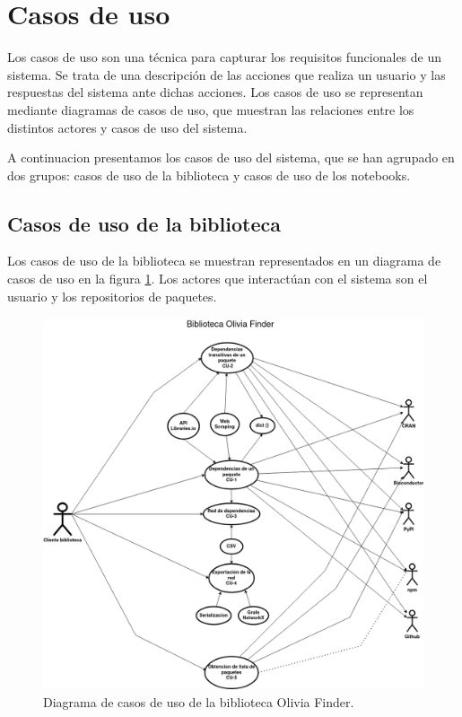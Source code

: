 \section{Casos de uso}

Los casos de uso son una técnica para capturar los requisitos funcionales de un sistema. Se trata de una 
descripción de las acciones que realiza un usuario y las respuestas del sistema ante dichas acciones. 
Los casos de uso se representan mediante diagramas de casos de uso, que muestran las relaciones entre los distintos actores y casos de uso del sistema.

A continuacion presentamos los casos de uso del sistema, que se han agrupado en dos grupos: casos de uso de la biblioteca y casos de uso de los notebooks.

\subsection{Casos de uso de la biblioteca}

Los casos de uso de la biblioteca se muestran representados en un diagrama de casos de uso en la figura \ref{fig:casos_de_uso}. 
Los actores que interactúan con el sistema son el usuario y los repositorios de paquetes.

\begin{figure}[h]
	\centering
	\includegraphics[width=1\textwidth]{img/anexos/Casos_uso_biblioteca.drawio.png}
	\caption{Diagrama de casos de uso de la biblioteca Olivia Finder.}
	\label{fig:casos_de_uso}
\end{figure}

